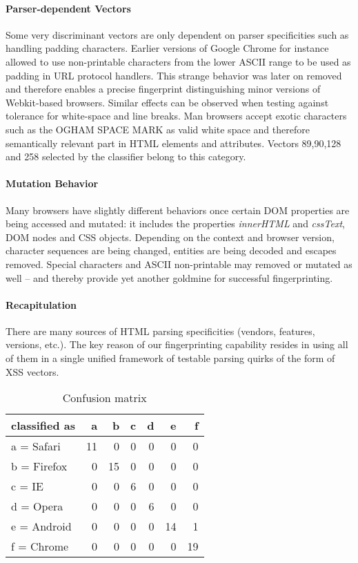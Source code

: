 \documentclass[10pt]{IEEEtran}
\begin{document}
\paragraph{Parser-dependent Vectors} 
Some very discriminant vectors are only dependent on parser specificities such as handling padding 
characters.
Earlier versions of Google Chrome for instance allowed to use 
non-printable characters from the lower ASCII range to be used as padding in URL protocol 
handlers. This strange behavior was later on removed and therefore enables a precise 
fingerprint distinguishing minor versions of Webkit-based browsers. 
Similar effects can be observed when testing against tolerance for white-space and line breaks. 
Man browsers accept exotic characters such as the OGHAM SPACE MARK as valid white space and
therefore semantically relevant part in HTML elements and attributes. Vectors 89,90,128 and 258 
selected by the classifier belong to this category.
 


\paragraph{Mutation Behavior} Many browsers have slightly different behaviors 
once certain DOM properties are being accessed and mutated: it includes the properties \textit{innerHTML} 
and \textit{cssText}, DOM nodes and CSS objects. Depending on the context and browser version, 
character sequences are being changed, entities are being decoded and escapes removed. 
Special characters and ASCII non-printable may removed or mutated as well -- and
thereby provide yet another goldmine for successful fingerprinting. 
\paragraph{Recapitulation}
There are many sources of HTML parsing specificities (vendors, features, versions, etc.).
The key reason of our fingerprinting capability resides in using all of them in a single unified framework of testable parsing quirks
of the form of XSS vectors.
\begin{table}
  \centering
  \caption{Confusion matrix}
    \begin{tabular}{l|rrrrrr}
    \hline
    classified as & a     & b     & c     & d     & e     & f \\
    \hline
    a = Safari & 11 & 0 & 0 & 0 & 0 & 0 \\
    b = Firefox & 0 & 15 & 0 & 0 & 0 & 0 \\
    c = IE & 0 & 0 & 6 & 0 & 0 & 0 \\
    d = Opera & 0 & 0 & 0 & 6 & 0 & 0 \\
    e = Android & 0 & 0 & 0 & 0 & 14 & 1 \\
    f = Chrome & 0 & 0 & 0 & 0 & 0 & 19 \\
    \hline
    \end{tabular}
  \label{tab:confusionmatrix}
\end{table}
\end{document}
